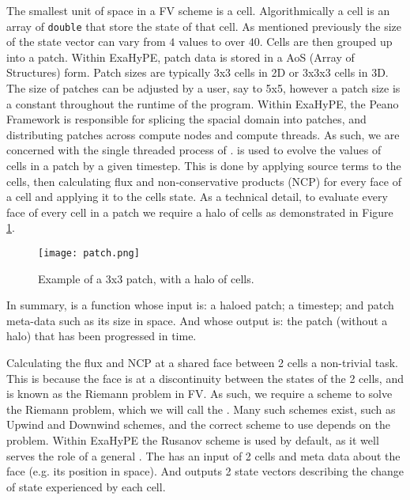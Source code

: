 The smallest unit of space in a FV scheme is a cell.
Algorithmically a cell is an array of \lstinline{double} that store the state of that cell.
As mentioned previously the size of the state vector can vary from $4$ values to over $40$.
Cells are then grouped up into a patch.
Within ExaHyPE, patch data is stored in a AoS (Array of Structures) form.
Patch sizes are typically 3x3 cells in 2D or 3x3x3 cells in 3D.
The size of patches can be adjusted by a user, say to 5x5, however a patch size is a constant throughout the runtime of the program.
Within ExaHyPE, the Peano Framework \cite{PeanoFramework} is responsible for splicing the spacial domain into patches, and distributing patches across compute nodes and compute threads.
As such, we are concerned with the single threaded process of .
 is used to evolve the values of cells in a patch by a given timestep.
This is done by applying source terms to the cells, then calculating flux and non-conservative products (NCP) for every face of a cell and applying it to the cells state.
As a technical detail, to evaluate every face of every cell in a patch we require a halo of cells as demonstrated in Figure \ref{fig:patch}.

\begin{figure}[h!]
    \begin{center}
        \texttt{[image: patch.png]}
        \caption{Example of a 3x3 patch, with a halo of cells.}
        \label{fig:patch}
    \end{center}
\end{figure}


In summary,  is a function whose input is: a haloed patch; a timestep; and patch meta-data such as its size in space. And whose output is: the patch (without a halo) that has been progressed in time. 

Calculating the flux and NCP at a shared face between 2 cells a non-trivial task.
This is because the face is at a discontinuity between the states of the 2 cells, and is known as the Riemann problem in FV.
As such, we require a scheme to solve the Riemann problem, which we will call the .
Many such schemes exist, such as Upwind and Downwind schemes, and the correct scheme to use depends on the problem.
Within ExaHyPE the Rusanov scheme \cite{rusanov} is used by default, as it well serves the role of a general .
The  has an input of 2 cells and meta data about the face (e.g. its position in space).
And outputs 2 state vectors describing the change of state experienced by each cell.

